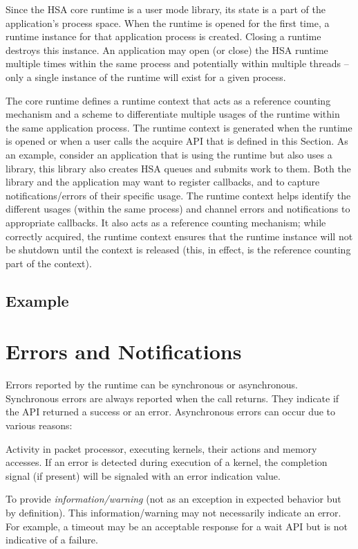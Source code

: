 \documentclass[draft]{book}
\begin{document}
Since the HSA core runtime is a user mode library, its state is a part of the
application's process space. When the runtime is opened for the first time, a
runtime instance for that application process is created. Closing a runtime
destroys this instance. An application may open (or close) the HSA runtime
multiple times within the same process and potentially within multiple threads
-- only a single instance of the runtime will exist for a given process.

The core runtime defines a runtime context that acts as a reference counting
mechanism and a scheme to differentiate multiple usages of the runtime within
the same application process. The runtime context is generated when the runtime
is opened or when a user calls the acquire API that is defined in this
Section. As an example, consider an application that is using the runtime but
also uses a library, this library also creates HSA queues and submits work to
them. Both the library and the application may want to register callbacks, and
to capture notifications/errors of their specific usage. The runtime context
helps identify the different usages (within the same process) and channel errors
and notifications to appropriate callbacks. It also acts as a reference counting
mechanism; while correctly acquired, the runtime context ensures that
the runtime instance will not be shutdown until the context is released
(this, in effect, is the reference counting part of the context).

\subsection{Example}


\section{Errors and Notifications}
\label{error}

Errors reported by the runtime can be synchronous or asynchronous. Synchronous
errors are always reported when the call returns. They indicate if the API
returned a success or an error. Asynchronous errors can occur due to various
reasons:\begin{inparaenum}[(i)]
\item Activity in packet processor, executing kernels, their actions and memory
  accesses. If an error is detected during execution of a kernel, the completion
  signal (if present) will be signaled with an error indication value.
\item To provide \textit{information/warning} (not as an exception in expected
  behavior but by definition). This information/warning may not necessarily
  indicate an error. For example, a timeout may be an acceptable response for a
  wait API but is not indicative of a failure.
\end{inparaenum}
\end{document}
